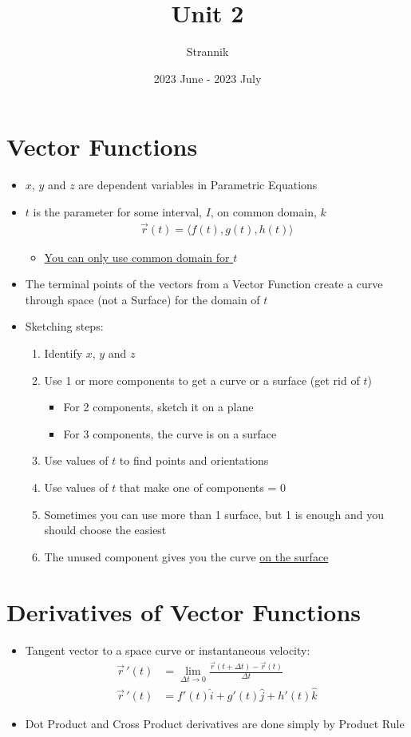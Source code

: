 \documentclass{article}
\title{Unit 2}
\author{Strannik}
\date{2023 June - 2023 July}
\begin{document}
\maketitle
\section{Vector Functions}
\begin{itemize}
  \item $x$, $y$ and $z$ are dependent variables in Parametric Equations
  \item $t$ is the parameter for some interval, $I$, on common domain, $k$
  \begin{align}
    \vec{r}(t) = \langle f(t), g(t), h(t) \rangle
  \end{align}
  \begin{itemize}
    \item \underline{You can only use common domain for $t$}
  \end{itemize}
  \item The terminal points of the vectors from a Vector Function create a curve through space (not a Surface) for the domain of $t$
  \item Sketching steps:
  \begin{enumerate}
    \item Identify $x$, $y$ and $z$
    \item Use 1 or more components to get a curve or a surface (get rid of $t$)
    \begin{itemize}
      \item For 2 components, sketch it on a plane
      \item For 3 components, the curve is on a surface
    \end{itemize}
  \item Use values of $t$ to find points and orientations
  \item Use values of $t$ that make one of components = 0
  \item Sometimes you can use more than 1 surface, but 1 is enough and you should choose the easiest
  \item The unused component gives you the curve \underline{on the surface}
  \end{enumerate}
\end{itemize}


\section{Derivatives of Vector Functions}
\begin{itemize}
  \item Tangent vector to a space curve or instantaneous velocity:
\begin{align}
  \vec{r}\,'(t) &= \lim_{\Delta t \to 0} \frac{\vec{r}(t + \Delta t) - \vec{r}(t)}{\Delta t} \\
  \vec{r}\,'(t) &= f'(t)\hat{i} + g'(t)\hat{j} + h'(t)\hat{k} 
\end{align}
  \item Dot Product and Cross Product derivatives are done simply by Product Rule
\end{itemize}
\end{document}
